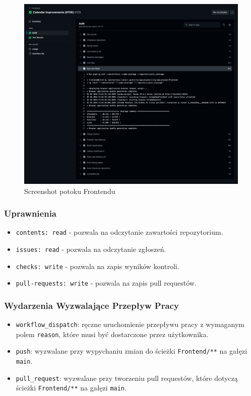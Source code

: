 \begin{figure}[H]
    \centering
    \includegraphics[width=1\textwidth]{attachments/frontend-ci}
    \caption{Screenshot potoku Frontendu}
\end{figure}

\subsubsection{Uprawnienia}
\begin{itemize}
    \item \texttt{\textcolor{codeblue}{contents: read}} - pozwala na odczytanie zawartości repozytorium.
    \item \texttt{\textcolor{codeblue}{issues: read}} - pozwala na odczytanie zgłoszeń.
    \item \texttt{\textcolor{codeblue}{checks: write}} - pozwala na zapis wyników kontroli.
    \item \texttt{\textcolor{codeblue}{pull-requests: write}} - pozwala na zapis pull requestów.
\end{itemize}

\subsubsection{Wydarzenia Wyzwalające Przepływ Pracy}
\begin{itemize}
    \item \texttt{\textcolor{codeblue}{workflow\_dispatch}}: ręczne uruchomienie przepływu pracy z wymaganym polem \texttt{\textcolor{codeblue}{reason}}, które musi być dostarczone przez użytkownika.
    \item \texttt{\textcolor{codeblue}{push}}: wyzwalane przy wypychaniu zmian do ścieżki \texttt{\textcolor{codeblue}{Frontend/**}} na gałęzi \texttt{\textcolor{codeblue}{main}}.
    \item \texttt{\textcolor{codeblue}{pull\_request}}: wyzwalane przy tworzeniu pull requestów, które dotyczą ścieżki \texttt{\textcolor{codeblue}{Frontend/**}} na gałęzi \texttt{\textcolor{codeblue}{main}}.
\end{itemize}

